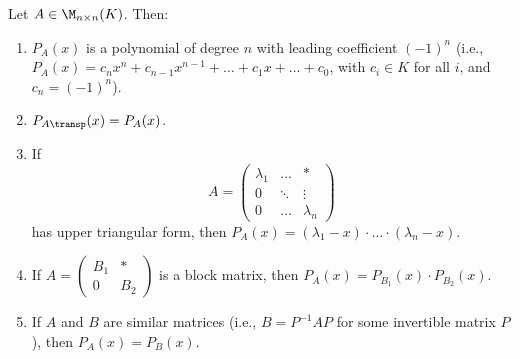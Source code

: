 \begin{lemma}\label{lem:properties_char_poly}
  Let $A \in \M_{n \times n}(K)$. Then:
  \begin{enumerate}[label=\textbf{(\alph*)}]
    \item $P_A(x)$ is a polynomial of degree $n$ with leading coefficient $(-1)^n$ (i.e., $P_A(x) = c_n x^n + c_{n-1} x^{n-1} + \dots + c_1 x + \dots + c_0$, with $c_i \in K$ for all $i$, and $c_n = (-1)^n$).
    \item $P_{A\transp}(x) = P_A(x)$.
    \item If
    \[
    A = \begin{pmatrix} \lambda_1 & \dots & * \\ 0 & \ddots & \vdots \\ 0 & \dots & \lambda_n \end{pmatrix}
    \]
    has upper triangular form, then $P_A(x) = (\lambda_1 - x) \cdot \dots \cdot (\lambda_n - x)$.
    \item If $A = \left(\begin{array}{c|c} B_1 & * \\ \hline 0 & B_2 \end{array}\right)$ is a block matrix, then $P_A(x) = P_{B_1}(x) \cdot P_{B_2}(x)$.
    \item If $A$ and $B$ are similar matrices (i.e., $B = P^{-1}AP$ for some invertible matrix $P$), then $P_A(x) = P_B(x)$.
  \end{enumerate}
\end{lemma}


